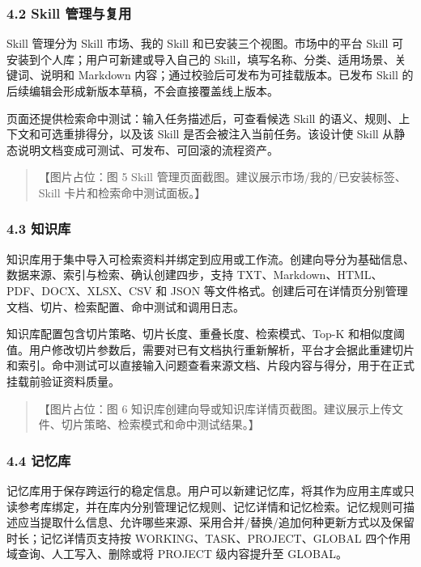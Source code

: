 \documentclass[UTF8,a4paper,12pt]{ctexart}
\begin{document}
\subsubsection{4.2 Skill 管理与复用}

Skill 管理分为 Skill 市场、我的 Skill 和已安装三个视图。市场中的平台 Skill 可安装到个人库；用户可新建或导入自己的 Skill，填写名称、分类、适用场景、关键词、说明和 Markdown 内容；通过校验后可发布为可挂载版本。已发布 Skill 的后续编辑会形成新版本草稿，不会直接覆盖线上版本。

页面还提供检索命中测试：输入任务描述后，可查看候选 Skill 的语义、规则、上下文和可选重排得分，以及该 Skill 是否会被注入当前任务。该设计使 Skill 从静态说明文档变成可测试、可发布、可回滚的流程资产。

\begin{quote}
【图片占位：图 5 Skill 管理页面截图。建议展示市场/我的/已安装标签、Skill 卡片和检索命中测试面板。】
\end{quote}

\subsubsection{4.3 知识库}

知识库用于集中导入可检索资料并绑定到应用或工作流。创建向导分为基础信息、数据来源、索引与检索、确认创建四步，支持 TXT、Markdown、HTML、PDF、DOCX、XLSX、CSV 和 JSON 等文件格式。创建后可在详情页分别管理文档、切片、检索配置、命中测试和调用日志。

知识库配置包含切片策略、切片长度、重叠长度、检索模式、Top-K 和相似度阈值。用户修改切片参数后，需要对已有文档执行重新解析，平台才会据此重建切片和索引。命中测试可以直接输入问题查看来源文档、片段内容与得分，用于在正式挂载前验证资料质量。

\begin{quote}
【图片占位：图 6 知识库创建向导或知识库详情页截图。建议展示上传文件、切片策略、检索模式和命中测试结果。】
\end{quote}

\subsubsection{4.4 记忆库}

记忆库用于保存跨运行的稳定信息。用户可以新建记忆库，将其作为应用主库或只读参考库绑定，并在库内分别管理记忆规则、记忆详情和记忆检索。记忆规则可描述应当提取什么信息、允许哪些来源、采用合并/替换/追加何种更新方式以及保留时长；记忆详情页支持按 WORKING、TASK、PROJECT、GLOBAL 四个作用域查询、人工写入、删除或将 PROJECT 级内容提升至 GLOBAL。
\end{document}
